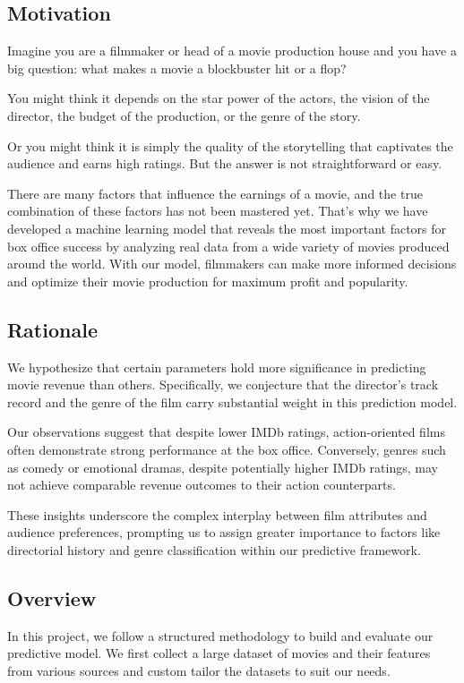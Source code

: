 \documentclass[conference]{IEEEtran}
\begin{document}
    \subsection{Motivation}
        Imagine you are a filmmaker or head of a movie production house and you have a big question: what makes a movie a blockbuster hit or a flop?

        You might think it depends on the star power of the actors, the vision of the director, the budget of the production, or the genre of the story.

        Or you might think it is simply the quality of the storytelling that captivates the audience and earns high ratings.
        But the answer is not straightforward or easy.

        There are many factors that influence the earnings of a movie, and the true combination of these factors has not been mastered yet.
        That’s why we have developed a machine learning model that reveals the most important factors for box office success by analyzing real data from a wide variety of movies produced around the world.
        With our model, filmmakers can make more informed decisions and optimize their movie production for maximum profit and popularity.

    \subsection{Rationale}
        We hypothesize that certain parameters hold more significance in predicting movie revenue than others. Specifically, we conjecture that the director's track record and the genre of the film carry substantial weight in this prediction model.

        Our observations suggest that despite lower IMDb ratings, action-oriented films often demonstrate strong performance at the box office. Conversely, genres such as comedy or emotional dramas, despite potentially higher IMDb ratings, may not achieve comparable revenue outcomes to their action counterparts.

        These insights underscore the complex interplay between film attributes and audience preferences, prompting us to assign greater importance to factors like directorial history and genre classification within our predictive framework.

    \subsection{Overview}
        In this project, we follow a structured methodology to build and evaluate our predictive model. We first collect a large dataset of movies and their features from various sources and custom tailor the datasets to suit our needs.
\end{document}
